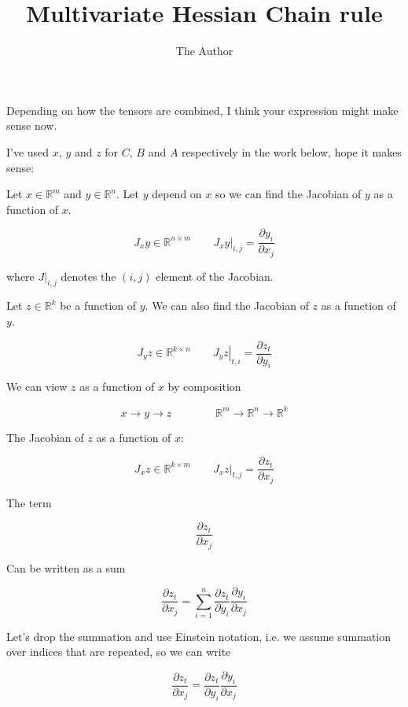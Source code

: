 \documentclass[11pt]{amsart}
\title{Multivariate Hessian Chain rule}
\author{The Author}
\begin{document}
\maketitle
Depending on how the tensors are combined, I think your expression might make sense now.

I've used $x$, $y$ and $z$ for $C$, $B$ and $A$ respectively in the work below, hope it makes sense:

Let $x\in \mathbb{R}^m$ and $y \in \mathbb{R}^n$. Let $y$ depend on $x$ so we can find the Jacobian of $y$ as a function of $x$.

$$
J_x y \in \mathbb{R}^{n \times m} \qquad
\left. J_{x} y \right|_{i,j}
= \frac{\partial y_{i}}{\partial x_{j}}
$$

where $J|_{i,j}$ denotes the $(i,j)$ element of the Jacobian.

Let $z \in \mathbb{R}^{k}$ be a function of $y$. We can also find the Jacobian of $z$ as a function of $y$.

$$
J_y z \in \mathbb{R}^{k \times n} \qquad
\left.
J_{y} z \right|_{t,i}
= \frac{\partial z_{t}}{\partial y_{i}}
$$

We can view $z$ as a function of $x$ by composition

$$
x \rightarrow y \rightarrow z \qquad \qquad
\mathbb{R}^{m} \rightarrow
\mathbb{R}^{n} \rightarrow
\mathbb{R}^{k}
$$

The Jacobian of $z$ as a function of $x$:


$$
J_x z \in \mathbb{R}^{k \times m} \qquad
\left.
J_{x} z \right|_{t,j}
= \frac{\partial z_{t}}{\partial x_{j}}
$$

The term

$$
\frac{\partial z_{t}}{\partial x_{j}}
$$

Can be written as a sum

$$
\frac{\partial z_{t}}{\partial x_{j}}
=
\sum_{i=1}^{n}
\frac{\partial z_{t}}{\partial y_{i}}
\frac{\partial y_{i}}{\partial x_{j}}
$$

Let's drop the summation and use Einstein notation, i.e. we assume summation over indices that are repeated, so we can write

$$
\frac{\partial z_{t}}{\partial x_{j}}
=
\frac{\partial z_{t}}{\partial y_{i}}
\frac{\partial y_{i}}{\partial x_{j}}
$$
\end{document}
